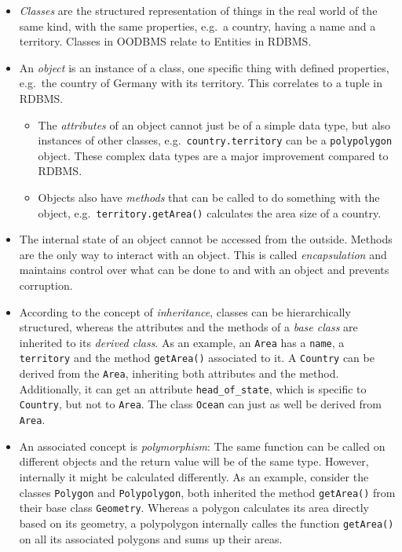 \begin{itemize}
  \item \emph{Classes} are the structured representation of things in the real world of the same kind, with the same properties, e.g.\ a country, having a name and a territory. Classes in OODBMS relate to Entities in RDBMS.
  \item An \emph{object} is an instance of a class, one specific thing with defined properties, e.g.\ the country of Germany with its territory. This correlates to a tuple in RDBMS.
  \begin{itemize}
    \item The \emph{attributes} of an object cannot just be of a simple data type, but also instances of other classes, e.g.\ \texttt{country.territory} can be a \texttt{polypolygon} object. These complex data types are a major improvement compared to RDBMS.
    \item Objects also have \emph{methods} that can be called to do something with the object, e.g.\ \texttt{territory.getArea()} calculates the area size of a country.
  \end{itemize}
  \item The internal state of an object cannot be accessed from the outside. Methods are the only way to interact with an object. This is called \emph{encapsulation} and maintains control over what can be done to and with an object and prevents corruption.
  \item According to the concept of \emph{inheritance}, classes can be hierarchically structured, whereas the attributes and the methods of a \emph{base class} are inherited to its \emph{derived class}. As an example, an \texttt{Area} has a \texttt{name}, a \texttt{territory} and the method \texttt{getArea()} associated to it. A \texttt{Country} can be derived from the \texttt{Area}, inheriting both attributes and the method. Additionally, it can get an attribute \texttt{head\_of\_state}, which is specific to \texttt{Country}, but not to \texttt{Area}. The class \texttt{Ocean} can just as well be derived from \texttt{Area}.
  \item An associated concept is \emph{polymorphism}: The same function can be called on different objects and the return value will be of the same type. However, internally it might be calculated differently. As an example, consider the classes \texttt{Polygon} and \texttt{Polypolygon}, both inherited the method \texttt{getArea()} from their base class \texttt{Geometry}. Whereas a polygon calculates its area directly based on its geometry, a polypolygon internally calles the function \texttt{getArea()} on all its associated polygons and sums up their areas.
\end{itemize}

